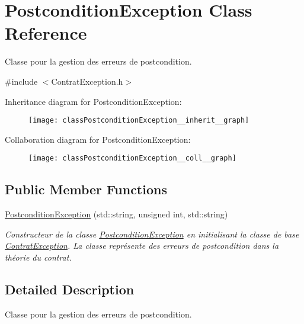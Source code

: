 \hypertarget{classPostconditionException}{}\section{Postcondition\+Exception Class Reference}
\label{classPostconditionException}


Classe pour la gestion des erreurs de postcondition.  




{\ttfamily \#include $<$Contrat\+Exception.\+h$>$}



Inheritance diagram for Postcondition\+Exception\+:\nopagebreak
\begin{figure}[H]
\begin{center}
\leavevmode
\texttt{[image: classPostconditionException\_\_inherit\_\_graph]}
\end{center}
\end{figure}


Collaboration diagram for Postcondition\+Exception\+:\nopagebreak
\begin{figure}[H]
\begin{center}
\leavevmode
\texttt{[image: classPostconditionException\_\_coll\_\_graph]}
\end{center}
\end{figure}
\subsection*{Public Member Functions}
\begin{DoxyCompactItemize}
\item 
\hyperlink{classPostconditionException_acc95ea17c4302b996261b7201d2cf6c4}{Postcondition\+Exception} (std\+::string, unsigned int, std\+::string)
\begin{DoxyCompactList}\small\item\em Constructeur de la classe \hyperlink{classPostconditionException}{Postcondition\+Exception} en initialisant la classe de base \hyperlink{classContratException}{Contrat\+Exception}. La classe représente des erreurs de postcondition dans la théorie du contrat. \end{DoxyCompactList}\end{DoxyCompactItemize}


\subsection{Detailed Description}
Classe pour la gestion des erreurs de postcondition. 

